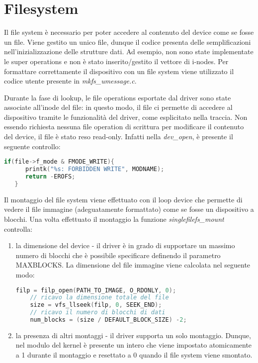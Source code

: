 \documentclass[a4paper,12pt,oneside]{book}
\begin{document}
	\section{Filesystem}
	Il file system è necessario per poter accedere al contenuto del device come se fosse un file. Viene gestito un unico file, dunque il codice presenta delle semplificazioni nell'inizializzazione delle strutture dati. Ad esempio, non sono state implementate le super operations e non è stato inserito/gestito il vettore di i-nodes. Per formattare correttamente il dispositivo con un file system viene utilizzato il codice utente presente in \emph{mkfs\_umessage.c}.\\
	\par Durante la fase di lookup, le file operations esportate dal driver sono state associate all'inode del file: in questo modo, il file ci permette di accedere al dispositivo tramite le funzionalità del driver, come esplicitato nella traccia. Non essendo richiesta nessuna file operation di scrittura per modificare il contenuto del device, il file è stato reso read-only. Infatti nella \emph{dev\_open}, è presente il seguente controllo:\\
\begin{lstlisting}[language=C]
   if(file->f_mode & FMODE_WRITE){
      printk("%s: FORBIDDEN WRITE", MODNAME);
      return -EROFS;
   }
\end{lstlisting}

\bigskip
\bigskip
	Il montaggio del file system viene effettuato con il loop device che permette di vedere il file immagine (adeguatamente formattato) come se fosse un dispositivo a blocchi. Una volta effettuato il montaggio la funzione \emph{singlefilefs\_mount} controlla:
\begin{enumerate}
	\item la dimensione del device - il driver è in grado di supportare un massimo numero di blocchi che è possibile specificare definendo il parametro MAXBLOCKS. La dimensione del file immagine viene calcolata nel seguente modo:
\begin{lstlisting}[language=C]
	filp = filp_open(PATH_TO_IMAGE, O_RDONLY, 0);
	// ricavo la dimensione totale del file
	size = vfs_llseek(filp, 0, SEEK_END);
	// ricavo il numero di blocchi di dati
	num_blocks = (size / DEFAULT_BLOCK_SIZE) -2;        
\end{lstlisting}
	\item la presenza di altri montaggi - il driver supporta un solo montaggio. Dunque, nel modulo del kernel è presente un intero che viene impostato atomicamente a 1 durante il montaggio e resettato a 0 quando il file system viene smontato.\\
\end{enumerate}
\end{document}
